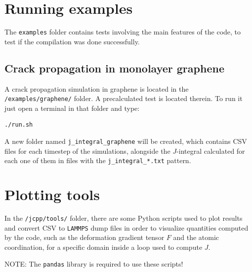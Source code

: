 \documentclass{ol-softwaremanual}
\begin{document}
\section{Running examples}
The \verb|examples| folder contains tests involving the main features of the code, to test if the compilation was done successfully.

\subsection{Crack propagation in monolayer graphene}
A crack propagation simulation in graphene is located in the \verb|/examples/graphene/| folder. A precalculated test is located therein. To run it just open a terminal in that folder and type:
\begin{verbatim}
./run.sh
\end{verbatim}
A new folder named \verb|j_integral_graphene| will be created, which contains CSV files for each timestep of the simulations, alongside the $J$-integral calculated for each one of them in files with the \verb|j_integral_*.txt| pattern.

\section{Plotting tools}
In the \verb|/jcpp/tools/| folder, there are some Python scripts used to plot results and convert CSV to \verb|LAMMPS| dump files in order to visualize quantities computed by the code, such as the deformation gradient tensor $F$ and the atomic coordination, for a specific domain inside a loop used to compute $J$. 

\noindent NOTE: The \verb|pandas| library is required to use these scripts!



\end{document}
